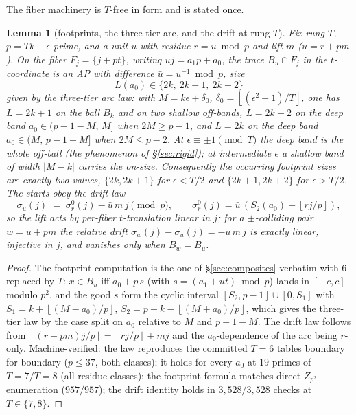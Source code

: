 \documentclass[11pt,a4paper]{article}
\numberwithin{equation}{section}
\theoremstyle{plain}
\newtheorem{lemma}[theorem]{Lemma}
\theoremstyle{definition}
\theoremstyle{remark}
\newcommand{\floor}[1]{\left\lfloor #1 \right\rfloor}
\begin{document}
The fiber machinery is $T$-free in form and is stated once.

\begin{lemma}[footprints, the three-tier arc, and the drift at rung $T$]
\label{lem:rungT}
Fix rung $T$, $p=Tk+\epsilon$ prime, and a unit $u$ with residue
$r=u\bmod p$ and lift $m$ ($u=r+pm$). On the fiber $F_j=\{j+pt\}$, writing
$uj=a_1p+a_0$, the trace $B_u\cap F_j$ in the $t$-coordinate is an AP
with difference $\bar u=u^{-1}\bmod p$, size
\[
L(a_0)\in\{2k,\ 2k+1,\ 2k+2\}
\]
given by the \emph{three-tier arc law}: with $M=k\epsilon+\delta_0$,
$\delta_0=\floor{(\epsilon^2-1)/T}$, one has $L=2k+1$ on the ball $B_k$
\emph{and} on two shallow off-bands, $L=2k+2$ on the deep band
$a_0\in(p-1-M,\,M]$ when $2M\ge p-1$, and $L=2k$ on the deep band
$a_0\in(M,\,p-1-M]$ when $2M\le p-2$. At $\epsilon\equiv\pm1\pmod T$ the
deep band is the whole off-ball (the phenomenon of \S\ref{sec:rigid});
at intermediate $\epsilon$ a shallow band of width $|M-k|$ carries the
on-size. Consequently the occurring footprint sizes are exactly two
values, $\{2k,2k+1\}$ for $\epsilon<T/2$ and $\{2k+1,2k+2\}$ for
$\epsilon>T/2$. The starts obey the \emph{drift law}
\[
\sigma_u(j)\;=\;\sigma_r^0(j)-\bar u\,m\,j\pmod p,
\qquad \sigma_r^0(j)=\bar u\,(S_2(a_0)-\floor{rj/p}),
\]
so the lift acts by per-fiber $t$-translation linear in $j$; for a
$\pm$-colliding pair $w=u+pm$ the relative drift
$\sigma_w(j)-\sigma_u(j)=-\bar u\,m\,j$ is exactly linear, injective in
$j$, and vanishes only when $B_w=B_u$.
\end{lemma}

\begin{proof}
The footprint computation is the one of \S\ref{sec:composites} verbatim
with $6$ replaced by $T$: $x\in B_u$ iff $a_0+p\,s$ (with
$s=(a_1+ut)\bmod p$) lands in $[-c,c]$ modulo $p^2$, and the good $s$
form the cyclic interval $[S_2,p-1]\cup[0,S_1]$ with
$S_1=k+\floor{(M-a_0)/p}$, $S_2=p-k-\floor{(M+a_0)/p}$, which gives the
three-tier law by the case split on $a_0$ relative to $M$ and $p-1-M$.
The drift law follows from $\floor{(r+pm)j/p}=\floor{rj/p}+mj$ and the
$a_0$-dependence of the arc being $r$-only. Machine-verified: the law
reproduces the committed $T=6$ tables boundary for boundary
($p\le37$, both classes); it holds for every $a_0$ at $19$ primes of
$T=7/T=8$ (all residue classes); the footprint formula matches direct
$Z_{p^2}$ enumeration ($957/957$); the drift identity holds in
$3{,}528/3{,}528$ checks at $T\in\{7,8\}$.
\end{proof}
\end{document}
